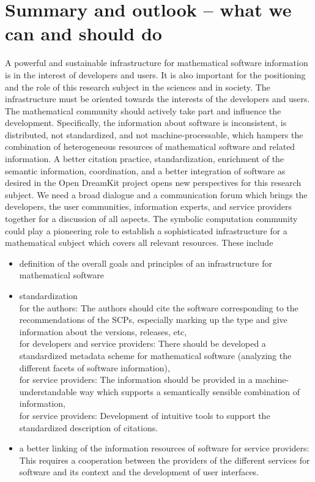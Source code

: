 \documentclass[12pt]{article}
\begin{document}
\section{Summary and outlook -- what we can and should do}

A powerful and sustainable infrastructure for mathematical software information
is in the interest of developers and users.  It is also important for the
positioning and the role of this research subject in the sciences and in
society.  The infrastructure must be oriented towards the interests of the
developers and users. The mathematical community should actively take part and
influence the development.  Specifically, the information about software is
inconsistent, is distributed, not standardized, and not machine-processable,
which hampers the combination of heterogeneous resources of mathematical
software and related information. A better citation practice, standardization,
enrichment of the semantic information, coordination, and a better integration
of software as desired in the Open DreamKit project \cite{OpenDreamKit} opens
new perspectives for this research subject.  We need a broad dialogue and a
communication forum which brings the developers, the user communities,
information experts, and service providers together for a discussion of all
aspects. The symbolic computation community could play a pioneering role to
establish a sophisticated infrastructure for a mathematical subject which
covers all relevant resources. These include
\begin{itemize}
\item{definition of the overall goals and principles of an infrastructure for
  mathematical software}
\item{standardization}\\ for the authors: The authors should cite the software
  corresponding to the recommendations of the SCPs, especially marking up the
  type and give information about the versions, releases, etc,\\ for developers
  and service providers: There should be developed a standardized metadata
  scheme for mathematical software (analyzing the different facets of software
  information),\\ for service providers: The information should be provided in
  a machine-understandable way which supports a semantically sensible
  combination of information,\\ for service providers: Development of intuitive
  tools to support the standardized description of citations.
\item{a better linking of the information resources of software} for service
  providers: This requires a cooperation between the providers of the different
  services for software and its context and the development of user interfaces.
\end{itemize}
\end{document}
